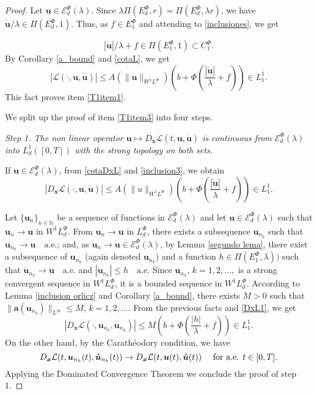 \documentclass[twoside]{elsarticle}
\theoremstyle{remark}
\newcommand{\lphi}{L^{\Phi}}
\newcommand{\ephi}{E^{\Phi}}
\newcommand{\claseor}{C^{\Phi}}
\newcommand{\wphi}{W^{1}\lphi}
\newcommand{\sobnor}{\|_{W^{1}\lphi}}
\newcommand{\domi}{\mathcal{E}^{\Phi}_d(\lambda)}
\renewcommand{\b}[1]{\boldsymbol{#1}}
\renewcommand{\leq}{\leqslant}
\begin{document}
\begin{proof} Let $\b{u}\in \domi$.
 Since  $\lambda\Pi(\ephi_d,r)=\Pi(\ephi_d,\lambda r)$, we have   $\b{\dot{u}}/\lambda\in\Pi(\ephi_d,1)$. 
Thus, as $f\in\ephi_1$ and attending to \eqref{inclusiones}, we get 

\begin{equation}\label{inclusion3}
|\b{\dot{u}}|/\lambda+f\in\Pi(\ephi_1,1)\subset \claseor_1.
\end{equation}
By Corollary \ref{a_bound} and \eqref{cotaL}, we get 
 \[|\mathcal{L}(\cdot,\b{u},\b{\dot{u}})| \leq A(\|\b{u}\sobnor ) \left(b+ \Phi\left (\frac{|\b{\dot{u}}|}{\lambda}+f\right)  \right)\in
 L^1_1.\]
This fact proves item \ref{T1item1}.

 We split up the proof of item \ref{T1item3} into four steps.

\noindent\emph{Step 1. The non linear operator  $\b{u} \mapsto D_{\b{x}}\mathcal{L}(t,\b{u},\b{\dot{u}})$ is continuous from $\domi$ into $L^{1}_d([0,T])$ with the strong topology on both sets.} 


If $\b{u}\in \domi$, from \eqref{cotaDxL} and \eqref{inclusion3}, we obtain 
\begin{equation}\label{DxL1}
|D_{\b{x}}\mathcal{L}(\cdot,\b{u},\b{\dot{u}})|\leq A(\|u\sobnor) \left(b+\Phi\left(\frac{|\b{\dot{u}}|}{\lambda}+f\right)\right) \in L^1_1.
\end{equation}


Let   $\{\b{u}_n\}_{n\in \mathbb{N}}$ be a sequence of  functions in $\domi$  and let $\b{u}\in \domi$  such that $\b{u}_n\rightarrow \b{u}$ in $\wphi_d$.
From  $\b{u}_n\rightarrow \b{u}$ in $\lphi_d$, there exists a subsequence $\b{u}_{n_k}$ such that $\b{u}_{n_k}\rightarrow \b{u} \quad\text{a.e.}$; and, as $\b{\dot{u}}_n\rightarrow \b{\dot{u}}\in\domi$, by 
  Lemma \ref{segundo lema}, there exist a subsequence of  $\b{u}_{n_k}$ (again denoted $\b{u}_{n_k}$) and a function  $h\in \Pi(\ephi_1,\lambda))$
such that  $\b{\dot{u}}_{n_k}\rightarrow \b{\dot{u}} \quad\text{a.e.}$ and $|\b{\dot{u}}_{n_k}|\leq h\quad\text{a.e}$.  Since $\b{u}_{n_k}$, $k=1,2,\ldots,$ is a strong convergent sequence in $\wphi_d$, it is a bounded sequence in $\wphi_d$. According to Lemma \ref{inclusion orlicz} and Corollary \ref{a_bound}, there exists $M>0$ such that $\|\b{a}(\b{u}_{n_k})\|_{L^{\infty}} \leq M$, $k=1,2,\ldots$.  From the previous facts and \eqref{DxL1}, we get
\begin{equation*}\label{DxL1-bis}
|D_{\b{x}}\mathcal{L}(\cdot,\b{u}_{n_k},\b{\dot{u}}_{n_k})|\leq M\left(b+\Phi\left(\frac{|h|}{\lambda}+f\right)\right) \in L^1_1.
\end{equation*}
On the other hand, by the Carath\'eodory condition, we have
\[D_{\b{x}}\mathcal{L}(t,\b{u}_{n_k}(t),\b{\dot{u}}_{n_k}(t))\to D_{\b{x}}\mathcal{L}(t,\b{u}(t),\b{\dot{u}}(t))\quad\hbox{ for a.e. } t\in[0,T].\]
Applying the Dominated Convergence Theorem we conclude the proof of step 1.


\end{proof}
\end{document}
